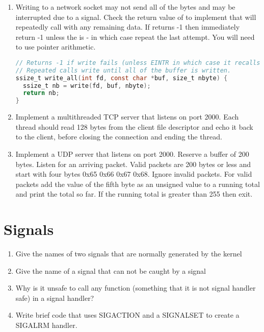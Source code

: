 \begin{enumerate}
\item Writing to a network socket may not send all of the bytes and may be interrupted due to a signal. Check the return value of  to implement  that will repeatedly call  with any remaining data. If  returns -1 then immediately return -1 unless the  is  - in which case repeat the last  attempt. You will need to use pointer arithmetic.

\begin{lstlisting}[language=C]
// Returns -1 if write fails (unless EINTR in which case it recalls write
// Repeated calls write until all of the buffer is written.
ssize_t write_all(int fd, const char *buf, size_t nbyte) {
  ssize_t nb = write(fd, buf, nbyte);
  return nb;
}
\end{lstlisting}

\item Implement a multithreaded TCP server that listens on port 2000. Each thread should read 128 bytes from the client file descriptor and echo it back to the client, before closing the connection and ending the thread.

\item Implement a UDP server that listens on port 2000. Reserve a buffer of 200 bytes. Listen for an arriving packet. Valid packets are 200 bytes or less and start with four bytes 0x65 0x66 0x67 0x68. Ignore invalid packets. For valid packets add the value of the fifth byte as an unsigned value to a running total and print the total so far. If the running total is greater than 255 then exit.

\end{enumerate}

\section{Signals}

\begin{enumerate}
\item Give the names of two signals that are normally generated by the kernel
\item Give the name of a signal that can not be caught by a signal
\item Why is it unsafe to call any function (something that it is not signal handler safe) in a signal handler?
\item Write brief code that uses SIGACTION and a SIGNALSET to create a SIGALRM handler.
\end{enumerate}

